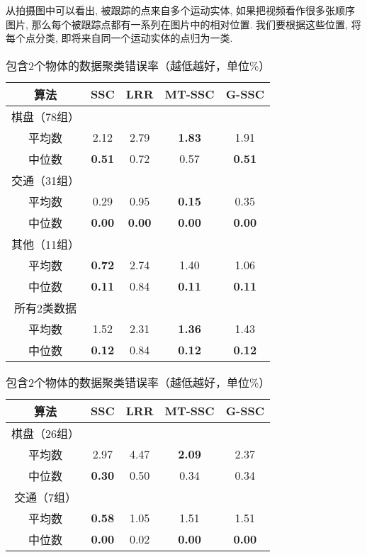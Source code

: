从拍摄图中可以看出, 被跟踪的点来自多个运动实体, 如果把视频看作很多张顺序
图片, 那么每个被跟踪点都有一系列在图片中的相对位置. 我们要根据这些位置,
将每个点分类, 即将来自同一个运动实体的点归为一类.
\begin{table}[!htb]
  \centering
  \begin{tabular}{|c|c|c|c|c|}
	\hline
	算法 & SSC  & LRR  & MT-SSC        & G-SSC         \\ \hline \hline 
	棋盘（78组） &      &      &               &               \\
	平均数     & 2.12 & 2.79 & \textbf{1.83} & 1.91 \\
    中位数     & \textbf{0.51} & 0.72 & 0.57   &\textbf{0.51}  \\ \hline
	交通（31组） &      &      &               &               \\
	平均数     & 0.29 & 0.95 & \textbf{0.15} & 0.35          \\
    中位数     & \textbf{0.00} & \textbf{0.00} & \textbf{0.00}& \textbf{0.00} \\ \hline
	其他（11组） &      &      &               &               \\
    平均数     & \textbf{0.72} & 2.74 & 1.40          & 1.06          \\
    中位数     & \textbf{0.11} & 0.84 &\textbf{0.11} & \textbf{0.11}   \\ \hline
	所有2类数据  &      &      &               &               \\
	平均数     & 1.52 & 2.31 & \textbf{1.36} & 1.43 \\
    中位数     & \textbf{0.12} & 0.84 & \textbf{0.12} & \textbf{0.12}  \\ \hline
  \end{tabular}
  \caption{包含2个物体的数据聚类错误率（越低越好，单位\%）}
  \bigskip
  \begin{tabular}{|c|c|c|c|c|}
	\hline
	算法 & SSC  & LRR  & MT-SSC        & G-SSC         \\ \hline \hline
	棋盘（26组） &      &      &               &               \\
	平均数     & 2.97 & 4.47 & \textbf{2.09} & 2.37 \\
    中位数     & \textbf{0.30} & 0.50 & 0.34 & 0.34          \\ \hline
	交通（7组）  &      &      &               &               \\
    平均数     & \textbf{0.58} & 1.05 & 1.51          & 1.51          \\
    中位数     & \textbf{0.00} & 0.02 & \textbf{0.00}& \textbf{0.00}  \\ \hline

\end{tabular}
\end{table}
